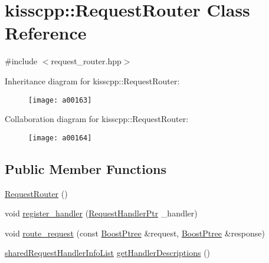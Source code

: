 \hypertarget{a00038}{\section{kisscpp\-:\-:Request\-Router Class Reference}
\label{a00038}
}


{\ttfamily \#include $<$request\-\_\-router.\-hpp$>$}



Inheritance diagram for kisscpp\-:\-:Request\-Router\-:\nopagebreak
\begin{figure}[H]
\begin{center}
\leavevmode
\texttt{[image: a00163]}
\end{center}
\end{figure}


Collaboration diagram for kisscpp\-:\-:Request\-Router\-:\nopagebreak
\begin{figure}[H]
\begin{center}
\leavevmode
\texttt{[image: a00164]}
\end{center}
\end{figure}
\subsection*{Public Member Functions}
\begin{DoxyCompactItemize}
\item 
\hyperlink{a00038_a3f894769b8eaac5829a078528d94450e}{Request\-Router} ()
\item 
void \hyperlink{a00038_ad99c50deee2ddca6bed2277886ecd3fa}{register\-\_\-handler} (\hyperlink{a00089_a21e40edcd4f1a3c7c1cc0015b576c8e5}{Request\-Handler\-Ptr} \-\_\-handler)
\item 
void \hyperlink{a00038_a5b53460864642f4b4ea435a3297102a6}{route\-\_\-request} (const \hyperlink{a00048_ab36820650b8e0db36402aea80485633c}{Boost\-Ptree} \&request, \hyperlink{a00048_ab36820650b8e0db36402aea80485633c}{Boost\-Ptree} \&response)
\item 
\hyperlink{a00089_aa107348bd263ff2c9358b497155d37b8}{shared\-Request\-Handler\-Info\-List} \hyperlink{a00038_a90d1738f2e97b5e8dbc13b8ce524747c}{get\-Handler\-Descriptions} ()
\end{DoxyCompactItemize}



